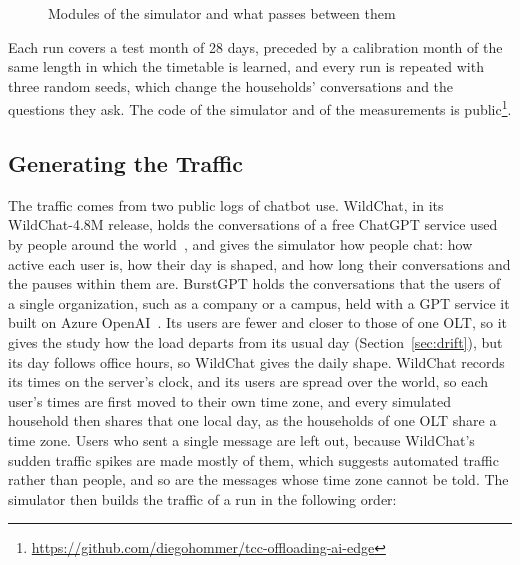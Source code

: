\documentclass[cic,dipl,english]{infufrgs}
\begin{document}
\begin{figure}[htb]
  \centering
  \caption{Modules of the simulator and what passes between them}
  \label{fig:simulator}
  \vspace{6pt}
  
\end{figure}

Each run covers a test month of 28 days, preceded by a calibration month
of the same length in which the timetable is learned, and every run is repeated with
three random seeds, which change the households' conversations and the questions they
ask. The code of the simulator and of the measurements is
public\footnote{\url{https://github.com/diegohommer/tcc-offloading-ai-edge}}.

\subsection{Generating the Traffic}
\label{sec:traffic}

The traffic comes from two public logs of chatbot use. WildChat, in its WildChat-4.8M release,
holds the conversations of a free ChatGPT service used by people around the
world~\cite{zhao2024wildchat}, and gives the simulator how people chat: how active each user is,
how their day is shaped, and how long their conversations and the pauses within them are.
BurstGPT holds the conversations that the users of a single organization, such as a company or a
campus, held with a GPT service it built on Azure OpenAI~\cite{wang2025burstgpt}. Its users are
fewer and closer to those of one OLT, so it gives the study how the load departs from its usual
day (Section~\ref{sec:drift}), but its day follows office hours, so WildChat gives the daily
shape. WildChat records its times on the server's
clock, and its users are spread over the world, so each user's times are first moved to their
own time zone, and every simulated household then shares that one local day, as the households of
one OLT share a time zone. Users who sent a single message are left out, because WildChat's sudden
traffic spikes are made mostly of them, which suggests automated traffic rather than people, and
so are the messages whose time zone cannot be told. The simulator then builds the traffic of a run
in the following order:
\end{document}
